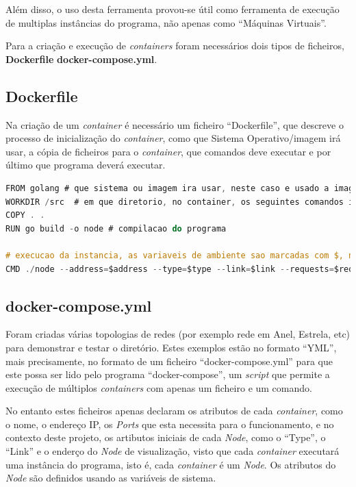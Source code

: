 Além disso, o uso desta ferramenta provou-se útil como ferramenta de execução de multiplas instâncias do programa, não apenas como ``Máquinas Virtuais''.

Para a criação e execução de \emph{containers} foram necessários dois tipos de ficheiros, \textbf{Dockerfile} \textbf{docker-compose.yml}.



\subsection*{Dockerfile}

Na criação de um \emph{container} é necessário um ficheiro ``Dockerfile'', que descreve o processo de inicialização do \emph{container}, como que Sistema Operativo/imagem irá usar, a cópia de ficheiros para o \emph{container}, que comandos deve executar e por último que programa deverá executar.


\begin{lstlisting}[caption={Iteração pelo ``Map'' ``Nodes'', instanciação do objeto e adicionado à lista },language=C]
FROM golang # que sistema ou imagem ira usar, neste caso e usado a imagem ``golang''
WORKDIR /src  # em que diretorio, no container, os seguintes comandos irao ser executados
COPY . .
RUN go build -o node # compilacao do programa

# execucao da instancia, as variaveis de ambiente sao marcadas com $, no entanto serao descritas a sua origem de seguida
CMD ./node --address=$address --type=$type --link=$link --requests=$requests --visualization=$VIS_ADDRESS

\end{lstlisting}

\subsection*{docker-compose.yml}

Foram criadas várias topologias de redes (por exemplo rede em Anel, Estrela, etc) para demonstrar e testar o diretório.
Estes exemplos estão no formato ``YML'', mais precisamente, no formato de um ficheiro ``docker-compose.yml'' para que este possa ser lido pelo programa ``docker-compose'', um \emph{script} que permite a execução de múltiplos \emph{containers} com apenas um ficheiro e um comando.

No entanto estes ficheiros apenas declaram os atributos de cada \emph{container}, como o nome, o endereço \acs{IP}, os \emph{Ports} que esta necessita para o funcionamento, e no contexto deste projeto, os artibutos iniciais de cada \emph{Node}, como o ``Type'', o 
``Link'' e o enderço do \emph{Node} de visualização, visto que cada \emph{container} executará uma instância do programa, isto é, cada \emph{container} é um \emph{Node}. Os atributos do \emph{Node} são definidos usando as variáveis de sistema.


